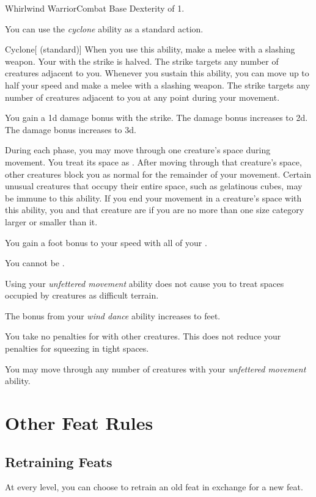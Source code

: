     \begin{feat}{Whirlwind Warrior}{Combat}
        \featpre Base Dexterity of 1.

         You can use the \textit{cyclone} ability as a standard action.
        \begin{freeability}{Cyclone}[ (standard)]
            When you use this ability, make a melee  with a slashing weapon.
            Your  with the strike is halved.
            The strike targets any number of creatures adjacent to you.
            Whenever you sustain this ability, you can move up to half your speed and make a melee  with a slashing weapon.
            The strike targets any number of creatures adjacent to you at any point during your movement.

            \rankline
             You gain a \plus1d damage bonus with the strike.
             The damage bonus increases to \plus2d.
             The damage bonus increases to \plus3d.
        \end{freeability}

         During each phase, you may move through one creature's space during movement.
        You treat its space as .
        After moving through that creature's space, other creatures block you as normal for the remainder of your movement.
        Certain unusual creatures that occupy their entire space, such as gelatinous cubes, may be immune to this ability.
        If you end your movement in a creature's space with this ability, you and that creature are  if you are no more than one size category larger or smaller than it.

         You gain a  foot bonus to your speed with all of your .

         You cannot be \surrounded.

         Using your \textit{unfettered movement} ability does not cause you to treat spaces occupied by creatures as difficult terrain.

         The bonus from your \textit{wind dance} ability increases to  feet.

         You take no penalties for  with other creatures.
        This does not reduce your penalties for squeezing in tight spaces.

         You may move through any number of creatures with your \textit{unfettered movement} ability.
    \end{feat}

\section{Other Feat Rules}

    \subsection{Retraining Feats}
        At every level, you can choose to retrain an old feat in exchange for a new feat.
